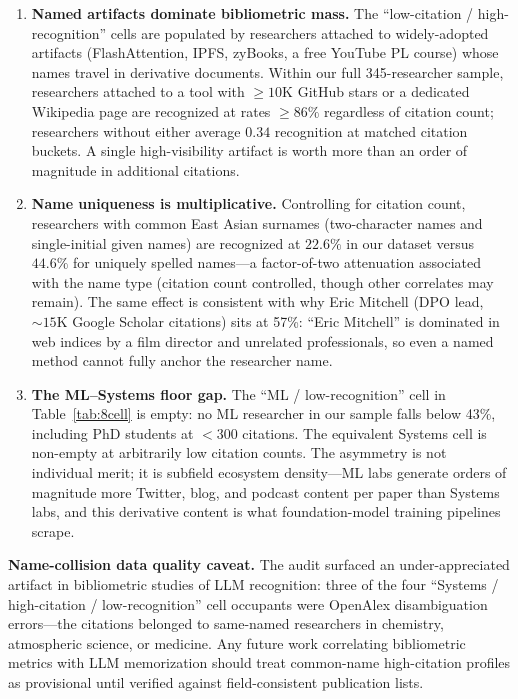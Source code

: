 \documentclass[11pt]{article}
\begin{document}
\begin{enumerate}[leftmargin=*, itemsep=2pt]
    \item \textbf{Named artifacts dominate bibliometric mass.} The ``low-citation / high-recognition'' cells are populated by researchers attached to widely-adopted artifacts (FlashAttention, IPFS, zyBooks, a free YouTube PL course) whose names travel in derivative documents. Within our full 345-researcher sample, researchers attached to a tool with $\geq 10$K GitHub stars or a dedicated Wikipedia page are recognized at rates $\geq 86\%$ regardless of citation count; researchers without either average $0.34$ recognition at matched citation buckets. A single high-visibility artifact is worth more than an order of magnitude in additional citations.
    \item \textbf{Name uniqueness is multiplicative.} Controlling for citation count, researchers with common East Asian surnames (two-character names and single-initial given names) are recognized at $22.6\%$ in our dataset versus $44.6\%$ for uniquely spelled names---a factor-of-two attenuation associated with the name type (citation count controlled, though other correlates may remain). The same effect is consistent with why Eric Mitchell (DPO lead, ${\sim}15$K Google Scholar citations) sits at 57\%: ``Eric Mitchell'' is dominated in web indices by a film director and unrelated professionals, so even a named method cannot fully anchor the researcher name.
    \item \textbf{The ML--Systems floor gap.} The ``ML / low-recognition'' cell in Table~\ref{tab:8cell} is empty: no ML researcher in our sample falls below 43\%, including PhD students at ${<}300$ citations. The equivalent Systems cell is non-empty at arbitrarily low citation counts. The asymmetry is not individual merit; it is subfield ecosystem density---ML labs generate orders of magnitude more Twitter, blog, and podcast content per paper than Systems labs, and this derivative content is what foundation-model training pipelines scrape.
\end{enumerate}

\textbf{Name-collision data quality caveat.} The audit surfaced an under-appreciated artifact in bibliometric studies of LLM recognition: three of the four ``Systems / high-citation / low-recognition'' cell occupants were OpenAlex disambiguation errors---the citations belonged to same-named researchers in chemistry, atmospheric science, or medicine. Any future work correlating bibliometric metrics with LLM memorization should treat common-name high-citation profiles as provisional until verified against field-consistent publication lists.
\end{document}
